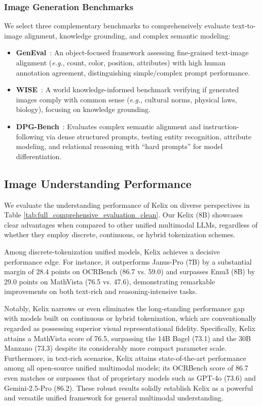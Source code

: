 \documentclass[11pt, a4paper, logo, copyright]{googledeepmind}
\begin{document}
\subsubsection{Image Generation Benchmarks}
We select three complementary benchmarks to comprehensively evaluate text-to-image alignment, knowledge grounding, and complex semantic modeling:
\begin{itemize}
    \item \textbf{GenEval}~\citep{ghosh2023geneval}: An object-focused framework assessing fine-grained text-image alignment (\textit{e.g.}, count, color, position, attributes) with high human annotation agreement, distinguishing simple/complex prompt performance.
    \item \textbf{WISE}~\citep{niu2025wise}: A world knowledge-informed benchmark verifying if generated images comply with common sense (\textit{e.g.}, cultural norms, physical laws, biology), focusing on knowledge grounding.
    \item \textbf{DPG-Bench}~\citep{hu2024ella}: Evaluates complex semantic alignment and instruction-following via dense structured prompts, testing entity recognition, attribute modeling, and relational reasoning with ``hard prompts'' for model differentiation.
\end{itemize}


\subsection{Image Understanding Performance} 
We evaluate the understanding performance of Kelix on diverse perspectives in Table \ref{tab:full_comprehensive_evaluation_clean}. Our Kelix (8B) showcases clear advantages when compared to other unified multimodal LLMs, regardless of whether they employ discrete, continuous, or hybrid tokenization schemes. 

Among discrete-tokenization unified models, Kelix achieves a decisive performance edge. For instance, it outperforms Janus-Pro (7B) by a substantial margin of 28.4 points on OCRBench (86.7 vs. 59.0) and surpasses Emu3 (8B) by 29.0 points on MathVista (76.5 vs. 47.6), demonstrating remarkable improvements on both text-rich and reasoning-intensive tasks.

Notably, Kelix narrows or even eliminates the long-standing performance gap with models built on continuous or hybrid tokenization, which are conventionally regarded as possessing superior visual representational fidelity. Specifically, Kelix attains a MathVista score of 76.5, surpassing the 14B Bagel (73.1) and the 30B Manzano (73.3) despite its considerably more compact parameter scale. Furthermore, in text-rich scenarios, Kelix attains state-of-the-art performance among all open-source unified multimodal models; its OCRBench score of 86.7 even matches or surpasses that of proprietary models such as GPT-4o (73.6) and Gemini-2.5-Pro (86.2). These robust results solidly establish Kelix as a powerful and versatile unified framework for general multimodal understanding.
\end{document}
